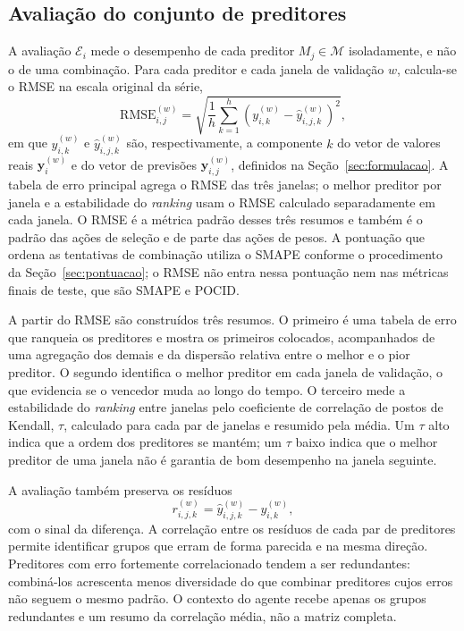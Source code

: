 \subsection{Avaliação do conjunto de preditores}

A avaliação $\mathcal{E}_i$ mede o desempenho de cada preditor $M_j \in \mathcal{M}$ isoladamente, e não o de uma combinação. Para cada preditor e cada janela de validação $w$, calcula-se o RMSE na escala original da série,
\begin{equation}
    \text{RMSE}_{i,j}^{(w)}
    =
    \sqrt{\frac{1}{h} \sum_{k=1}^{h}
        \left(y_{i,k}^{(w)} - \hat{y}_{i,j,k}^{(w)}\right)^2},
\end{equation}
em que $y_{i,k}^{(w)}$ e $\hat{y}_{i,j,k}^{(w)}$ são, respectivamente, a componente $k$ do vetor de valores reais $\mathbf{y}_i^{(w)}$ e do vetor de previsões $\hat{\mathbf{y}}_{i,j}^{(w)}$, definidos na Seção~\ref{sec:formulacao}. A tabela de erro principal agrega o RMSE das três janelas; o melhor preditor por janela e a estabilidade do \textit{ranking} usam o RMSE calculado separadamente em cada janela. O RMSE é a métrica padrão desses três resumos e também é o padrão das ações de seleção e de parte das ações de pesos. A pontuação que ordena as tentativas de combinação utiliza o SMAPE conforme o procedimento da Seção~\ref{sec:pontuacao}; o RMSE não entra nessa pontuação nem nas métricas finais de teste, que são SMAPE e POCID.

A partir do RMSE são construídos três resumos. O primeiro é uma tabela de erro que ranqueia os preditores e mostra os primeiros colocados, acompanhados de uma agregação dos demais e da dispersão relativa entre o melhor e o pior preditor. O segundo identifica o melhor preditor em cada janela de validação, o que evidencia se o vencedor muda ao longo do tempo. O terceiro mede a estabilidade do \textit{ranking} entre janelas pelo coeficiente de correlação de postos de Kendall, $\tau$, calculado para cada par de janelas e resumido pela média. Um $\tau$ alto indica que a ordem dos preditores se mantém; um $\tau$ baixo indica que o melhor preditor de uma janela não é garantia de bom desempenho na janela seguinte.

A avaliação também preserva os resíduos
\[
    r_{i,j,k}^{(w)}
    =
    \hat{y}_{i,j,k}^{(w)} - y_{i,k}^{(w)},
\]
com o sinal da diferença. A correlação entre os resíduos de cada par de preditores permite identificar grupos que erram de forma parecida e na mesma direção. Preditores com erro fortemente correlacionado tendem a ser redundantes: combiná-los acrescenta menos diversidade do que combinar preditores cujos erros não seguem o mesmo padrão. O contexto do agente recebe apenas os grupos redundantes e um resumo da correlação média, não a matriz completa.

